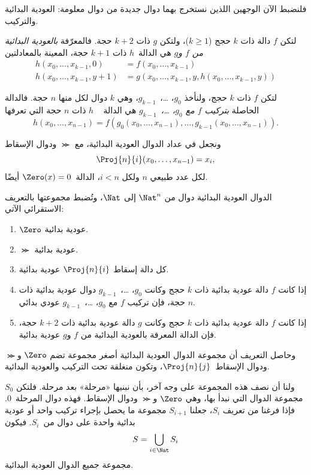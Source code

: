 \documentclass[../../../include/open-logic-section]{subfiles}
\begin{document}

فلنضبط الآن الوجهين اللذين نستخرج بهما دوال جديدة من دوال معلومة:
العودية البدائية والتركيب.

\begin{defn}
   لتكن $f$ دالة ذات $k$ حجج
  ($k\ge 1$)، ولتكن $g$ ذات $k+2$ حجة. فالمعرّفة
  \emph{بالعودية البدائية من $f$ و$g$} هي الدالة~$h$ ذات $k+1$ حجة،
  المعينة بالمعادلتين
  \begin{align*}
    h(x_0,\dots,x_{k-1},0) & =  f(x_0,\dots,x_{k-1}) \\
    h(x_0,\dots,x_{k-1},y+1) & = g(x_0,\dots,x_{k-1}, y, h(x_0,\dots,x_{k-1}, y))
  \end{align*}
\end{defn}

\begin{defn}
   لتكن $f$ ذات $k$ حجج، ولنأخذ
  $g_0$، …،~$g_{k-1}$، وهي $k$ دوال لكل منها $n$ حجة. فالدالة الحاصلة \emph{بتركيب $f$ مع $g_0$، …،~$g_{k-1}$} هي الدالة
  ~ $h$ ذات $n$ حجة التي تعرفها
  \[
  h(x_0, \dots, x_{n-1}) =
  f(g_0(x_0, \dots, x_{n-1}), \dots, g_{k-1}(x_0, \dots, x_{n-1})).
  \]
\end{defn}

ونجعل في عداد الدوال العودية البدائية، مع $\Succ$ ودوال الإسقاط
\[
\Proj{n}{i}(x_0,\dots,x_{n-1}) = x_i,
\]
لكل عدد طبيعي $n$ ولكل $i<n$، الدالة~$\Zero(x)=0$ أيضًا.

\begin{defn}
  الدوال العودية البدائية دوال من $\Nat^n$ إلى
  $\Nat$، وتُضبط مجموعتها بالتعريف الاستقرائي الآتي:
  \begin{enumerate}
  \item $\Zero$ عودية بدائية.
  \item $\Succ$ عودية بدائية.
  \item كل دالة إسقاط $\Proj{n}{i}$ عودية بدائية.
  \item إذا كانت $f$ دالة عودية بدائية ذات $k$ حجج وكانت $g_0$،
    …،~$g_{k-1}$ دوال عودية بدائية ذات $n$ حجة، فإن تركيب $f$ مع
    $g_0$، …،~$g_{k-1}$ عودي بدائي.
  \item إذا كانت $f$ دالة عودية بدائية ذات $k$ حجج وكانت $g$ دالة
    عودية بدائية ذات $k+2$ حجة، فإن الدالة المعرفة بالعودية البدائية
    من $f$ و$g$ عودية بدائية.
\end{enumerate}
\end{defn}

\begin{explain}
وحاصل التعريف أن مجموعة الدوال العودية البدائية أصغر مجموعة تضم
$\Zero$ و$\Succ$ ودوال الإسقاط~$\Proj{n}{j}$، وتكون منغلقة تحت
التركيب والعودية البدائية.

ولنا أن نصف هذه المجموعة على وجه آخر، بأن نبنيها
«مرحلة» بعد مرحلة. فلتكن $S_0$ مجموعة الدوال التي نبدأ بها، وهي $\Zero$ و$\Succ$ ودوال
الإسقاط. فهذه دوال المرحلة~$0$. فإذا فرغنا من
تعريف $S_i$، جعلنا $S_{i+1}$ مجموعة ما يحصل بإجراء
تركيب واحد أو عودية بدائية واحدة على دوال من~$S_i$.
فيكون
\[
S = \bigcup_{i \in \Nat} S_i
\]
مجموعة جميع الدوال العودية البدائية.
\end{explain}
\end{document}

